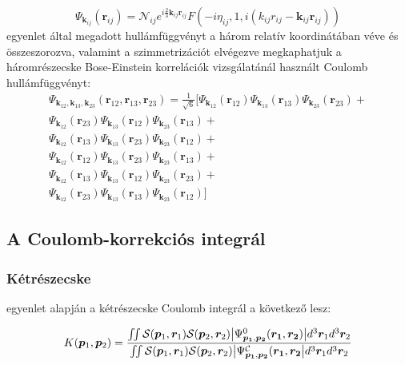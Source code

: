 \documentclass[10pt,a4paper]{article}
\numberwithin{equation}{subsection}
\numberwithin{figure}{section}
\begin{document}
\begin{equation}
\Psi_{\bm{k}_{ij}}(\bm{r}_{ij}) = \mathcal{N}_{ij}e^{i\frac{2}{3}\bm{k}_{ij}\bm{r}_{ij}}F(-i\eta_{ij},1,i(k_{ij}r_{ij}-\bm{k}_{ij}\bm{r}_{ij}))
\label{eq:Psikij}
\end{equation}
 egyenlet által megadott hullámfüggvényt a három relatív koordinátában véve és összeszorozva, valamint a szimmetrizációt elvégezve megkaphatjuk a háromrészecske Bose-Einstein korrelációk vizsgálatánál használt Coulomb hullámfüggvényt:
\begin{equation}
\begin{aligned}
\Psi_{\bm{k}_{12}, \bm{k}_{13}, \bm{k}_{23}}(\bm{r}_{12},\bm{r}_{13},\bm{r}_{23})  = \frac{1}{\sqrt{6}}\Bigg[
\Psi_{\bm{k}_{12}}(\bm{r}_{12})\Psi_{\bm{k}_{13}}(\bm{r}_{13})\Psi_{\bm{k}_{23}}(\bm{r}_{23})+\\
\Psi_{\bm{k}_{12}}(\bm{r}_{23})\Psi_{\bm{k}_{13}}(\bm{r}_{12})\Psi_{\bm{k}_{23}}(\bm{r}_{13})+\\ 
\Psi_{\bm{k}_{12}}(\bm{r}_{13})\Psi_{\bm{k}_{13}}(\bm{r}_{23})\Psi_{\bm{k}_{23}}(\bm{r}_{12})+\\
\Psi_{\bm{k}_{12}}(\bm{r}_{12})\Psi_{\bm{k}_{13}}(\bm{r}_{23})\Psi_{\bm{k}_{23}}(\bm{r}_{13})+\\
\Psi_{\bm{k}_{12}}(\bm{r}_{13})\Psi_{\bm{k}_{13}}(\bm{r}_{12})\Psi_{\bm{k}_{23}}(\bm{r}_{23})+\\
\Psi_{\bm{k}_{12}}(\bm{r}_{23})\Psi_{\bm{k}_{13}}(\bm{r}_{13})\Psi_{\bm{k}_{23}}(\bm{r}_{12})
\Bigg]
\end{aligned}
\end{equation}



\subsection{A Coulomb-korrekciós integrál}

\subsubsection{Kétrészecske}
 egyenlet alapján a kétrészecske Coulomb integrál a következő lesz:

\begin{equation}
K(\bm{p}_1,\bm{p}_2)=
\frac{
\iint \mathcal{S}(\bm{p}_1, \bm{r}_1)\mathcal{S}(\bm{p}_2, \bm{r}_2)
\abs{\Psi^{0}_{\bm{p_1},\bm{p_2}}(\bm{r_1},\bm{r_2})} d^3 \bm{r}_1d^3 \bm{r}_2
}{\iint \mathcal{S}(\bm{p}_1, \bm{r}_1)\mathcal{S}(\bm{p}_2, \bm{r}_2)
\abs{\Psi^\mathcal{C}_{\bm{p_1},\bm{p_2}}(\bm{r_1},\bm{r_2}}d^3 \bm{r}_1d^3 \bm{r}_2}
\label{eq:Kn2}
\end{equation}
\end{document}
